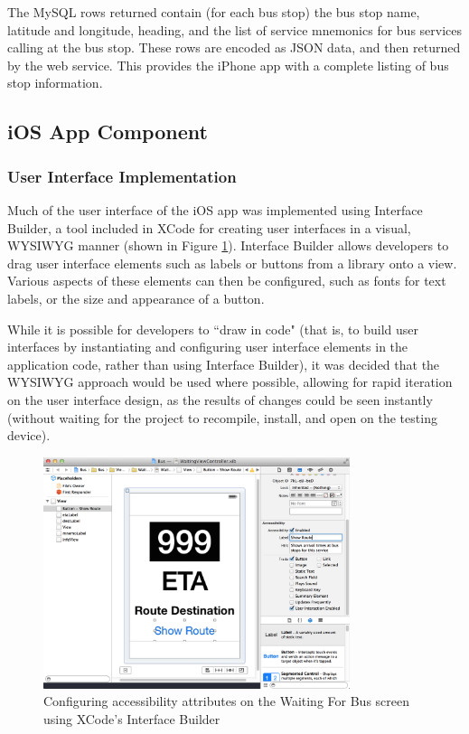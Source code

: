 \documentclass[10pt,twocolumn]{article}
\begin{document}
The MySQL rows returned contain (for each bus stop) the bus stop name, latitude and longitude, heading, and the list of service mnemonics for bus services calling at the bus stop. These rows are encoded as JSON data, and then returned by the web service. This provides the iPhone app with a complete listing of bus stop information.

\subsection{iOS App Component}
\subsubsection{User Interface Implementation}

Much of the user interface of the iOS app was implemented using Interface Builder, a tool included in XCode for creating user interfaces in a visual, WYSIWYG manner (shown in Figure \ref{fig:interface}). Interface Builder allows developers to drag user interface elements such as labels or buttons from a library onto a view. Various aspects of these elements can then be configured, such as fonts for text labels, or the size and appearance of a button.

While it is possible for developers to ``draw in code" (that is, to build user interfaces by instantiating and configuring user interface elements in the application code, rather than using Interface Builder), it was decided that the WYSIWYG approach would be used where possible, allowing for rapid iteration on the user interface design, as the results of changes could be seen instantly (without waiting for the project to recompile, install, and open on the testing device).

\begin{figure}[htbp]
    \centering
    \includegraphics[width=0.8\textwidth]{interface}
    \caption{Configuring accessibility attributes on the Waiting For Bus screen using XCode's Interface Builder}
    \label{fig:interface}
\end{figure}
\end{document}
